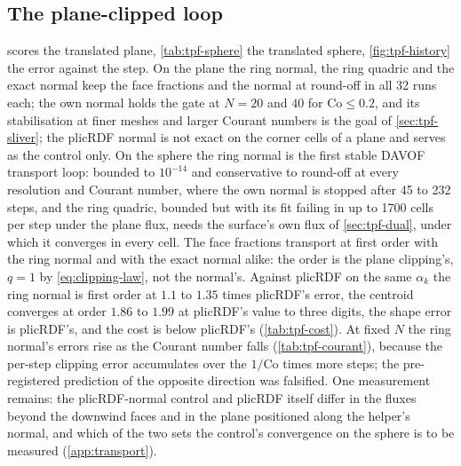 \documentclass[preprint,12pt]{elsarticle}
\begin{document}
\subsection{The plane-clipped loop}
\label{sec:tpf-plane-loop}

 scores the translated plane, \cref{tab:tpf-sphere} the translated sphere, \cref{fig:tpf-history} the error against the step. On the plane the ring normal, the ring quadric and the exact normal keep the face fractions and the normal at round-off in all 32 runs each; the own normal holds the gate at $N = 20$ and $40$ for $\mathrm{Co} \le 0.2$, and its stabilisation at finer meshes and larger Courant numbers is the goal of \cref{sec:tpf-sliver}; the plicRDF normal is not exact on the corner cells of a plane and serves as the control only. On the sphere the ring normal is the first stable DAVOF transport loop: bounded to $10^{-14}$ and conservative to round-off at every resolution and Courant number, where the own normal is stopped after 45 to 232 steps, and the ring quadric, bounded but with its fit failing in up to 1700 cells per step under the plane flux, needs the surface's own flux of \cref{sec:tpf-dual}, under which it converges in every cell. The face fractions transport at first order with the ring normal and with the exact normal alike: the order is the plane clipping's, $q = 1$ by \cref{eq:clipping-law}, not the normal's. Against plicRDF on the same $\alpha_k$ the ring normal is first order at $1.1$ to $1.35$ times plicRDF's error, the centroid converges at order $1.86$ to $1.99$ at plicRDF's value to three digits, the shape error is plicRDF's, and the cost is below plicRDF's (\cref{tab:tpf-cost}). At fixed $N$ the ring normal's errors rise as the Courant number falls (\cref{tab:tpf-courant}), because the per-step clipping error accumulates over the $1/\mathrm{Co}$ times more steps; the pre-registered prediction of the opposite direction was falsified. One measurement remains: the plicRDF-normal control and plicRDF itself differ in the fluxes beyond the downwind faces and in the plane positioned along the helper's normal, and which of the two sets the control's convergence on the sphere is to be measured (\ref{app:transport}).

\begin{table}[htbp]
\centering
\caption{The translated plane in TwoPhaseFlow: the plane of \cref{sec:plane} carried over $0.2L$ along its normal and along $(1, 0, 0)$, $N = 20, 40, 80, 160$, $\mathrm{Co} = 0.05$ to $0.5$. For every normal source and Courant number the number of the eight runs (two directions, four meshes) in which the face fractions and the normal stay at round-off over the whole run (both run maxima of $L_1$ below $10^{-12}$); the last column is the run maximum of $L_1(\alpha_f)$ at $N = 160$ and $\mathrm{Co} = 0.5$ on the normal arm (for plicRDF and isoAlpha, which carry no face fractions, the normal error), followed by the run maximum of $\max_k(1-\mathbf{n}\cdot\mathbf{n}_\Sigma)$ in the same run (\ref{app:measures}). Table body generated by \texttt{make\_table\_advection.py} from the study table.}
\label{tab:tpf-plane}
\footnotesize
\setlength{\tabcolsep}{4pt}
\resizebox{\linewidth}{!}{}
\end{table}
\end{document}

